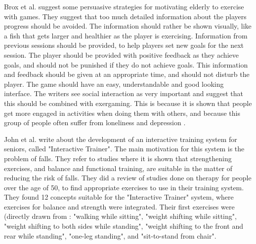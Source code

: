 Brox et al. \cite{exergamesforelderly} suggest some persuasive strategies for motivating elderly to exercise with games. They suggest that too much detailed information about the players progress should be avoided. The information should rather be shown visually, like a fish that gets larger and healthier as the player is exercising. Information from previous sessions should be provided, to help players set new goals for the next session. The player should be provided with positive feedback as they achieve goals, and should not be punished if they do not achieve goals. This information and feedback should be given at an appropriate time, and should not disturb the player. The game should have an easy, understandable and good looking interface. The writers see social interaction as very important and suggest that this should be combined with exergaming. This is because it is shown that people get more engaged in activities when doing them with others, and because this group of people often suffer from loneliness and depression \cite{exergamesforelderly}. 

John et al. \cite{john2012smartsenior} write about the development of an interactive training system for seniors, called "Interactive Trainer". The main motivation for this system is the problem of falls. They refer to studies where it is shown that strengthening exercises, and balance and functional training, are suitable in the matter of reducing the risk of falls. They did a review of studies done on therapy for people over the age of 50, to find appropriate exercises to use in their training system. They found 12 concepts suitable for the "Interactive Trainer" system, where exercises for balance and strength were integrated. Their first exercises were (directly drawn from \cite{john2012smartsenior}: "walking while sitting", "weight shifting while sitting", "weight shifting to both sides while standing", "weight shifting to the front and rear while standing", "one-leg standing", and "sit-to-stand from chair".
      
